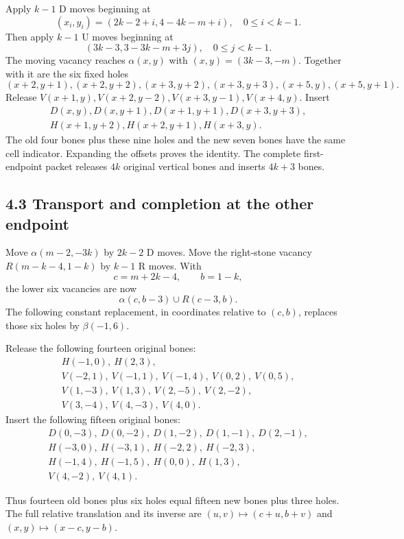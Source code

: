 Apply \(k-1\) D moves beginning at \[
(x_i,y_i)=(2k-2+i,4-4k-m+i),\quad 0\le i<k-1.
\] Then apply \(k-1\) U moves beginning at \[
(3k-3,3-3k-m+3j),\quad0\le j<k-1.
\] The moving vacancy reaches \(\alpha(x,y)\) with \((x,y)=(3k-3,-m)\).
Together with it are the six fixed holes \[
(x+2,y+1),(x+2,y+2),(x+3,y+2),(x+3,y+3),(x+5,y),(x+5,y+1).
\] Release \(V(x+1,y),V(x+2,y-2),V(x+3,y-1),V(x+4,y)\). Insert \[
\begin{gathered}
D(x,y),D(x,y+1),D(x+1,y+1),D(x+3,y+3),\\
H(x+1,y+2),H(x+2,y+1),H(x+3,y).
\end{gathered}
\] The old four bones plus these nine holes and the new seven bones have
the same cell indicator. Expanding the offsets proves the identity. The
complete first-endpoint packet releases \(4k\) original vertical bones
and inserts \(4k+3\) bones.

\subsection{4.3 Transport and completion at the other
endpoint}\label{transport-and-completion-at-the-other-endpoint}

Move \(\alpha(m-2,-3k)\) by \(2k-2\) D moves. Move the right-stone
vacancy \(R(m-k-4,1-k)\) by \(k-1\) R moves. With \[
c=m+2k-4,\qquad b=1-k,
\] the lower six vacancies are now \[
\alpha(c,b-3)\cup R(c-3,b).
\] The following constant replacement, in coordinates relative to
\((c,b)\), replaces those six holes by \(\beta(-1,6)\).

Release the following fourteen original bones: \[
\begin{gathered}
H(-1,0),\ H(2,3),\\
V(-2,1),\ V(-1,1),\ V(-1,4),\ V(0,2),\ V(0,5),\\
V(1,-3),\ V(1,3),\ V(2,-5),\ V(2,-2),\\
V(3,-4),\ V(4,-3),\ V(4,0).
\end{gathered}
\] Insert the following fifteen original bones: \[
\begin{gathered}
D(0,-3),\ D(0,-2),\ D(1,-2),\ D(1,-1),\ D(2,-1),\\
H(-3,0),\ H(-3,1),\ H(-2,2),\ H(-2,3),\\
H(-1,4),\ H(-1,5),\ H(0,0),\ H(1,3),\\
V(4,-2),\ V(4,1).
\end{gathered}
\]

Thus fourteen old bones plus six holes equal fifteen new bones plus
three holes. The full relative translation and its inverse are
\((u,v)\mapsto(c+u,b+v)\) and \((x,y)\mapsto(x-c,y-b)\).

